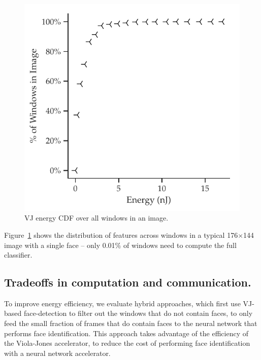 \begin{figure}
\centering
    \begin{center}
      \includegraphics[width=\textwidth]{nsp-figs/eval_vj_cdf2.pdf}
    \end{center}
\caption{VJ energy CDF over all windows in an image.}
\label{fig:vj-cdf}
\end{figure}

Figure~\ref{fig:vj-cdf} shows the
distribution of features across windows in a typical 176$\times$144 image with a single face -- only 0.01\%
of windows need to compute the full classifier.

\subsection{Tradeoffs in computation and communication.} To improve energy efficiency, we evaluate hybrid approaches, which first use VJ-based face-detection
to filter out the windows that do not contain faces, to only feed the small fraction of frames that do contain faces to the neural network that performs face identification.
This approach takes advantage of the efficiency of the Viola-Jones accelerator, to reduce the cost of performing face identification with a neural network accelerator.


